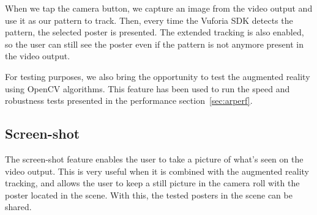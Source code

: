 When we tap the camera button, we capture an image from the video output and
use it as our pattern to track. Then, every time the Vuforia SDK detects the
pattern, the selected poster is presented. The extended tracking is also
enabled, so the user can still see the poster even if the pattern is not
anymore present in the video output.

For testing purposes, we also bring the opportunity to test the augmented
reality using OpenCV algorithms. This feature has been used to run the speed
and robustness tests presented in the performance section~\ref{sec:arperf}.

\subsection*{Screen-shot}
\label{sub:screenshot}
The screen-shot feature enables the user to take a picture of what's seen on the
video output. This is very useful when it is combined with the augmented
reality tracking, and allows the user to keep a still picture in the camera
roll with the poster located in the scene. With this, the tested posters in the
scene can be shared.


